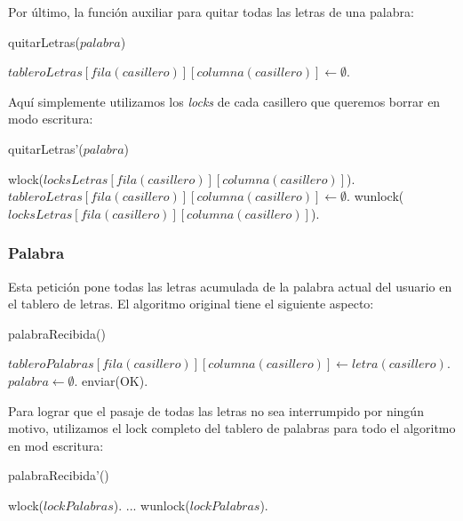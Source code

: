 Por último, la función auxiliar para quitar todas las letras de una palabra:

\begin{algorithm}[H]
\caption{quitarLetras($palabra$)}
\begin{algorithmic}[1]
        \STATE $tableroLetras[fila(casillero)][columna(casillero)] \leftarrow \emptyset$.
    \ENDFOR
\end{algorithmic}
\end{algorithm}

\noindent Aquí simplemente utilizamos los \emph{locks} de cada casillero que queremos borrar en modo escritura:

\begin{algorithm}[H]
\caption{quitarLetras'($palabra$)}
\begin{algorithmic}[1]
        \STATE wlock($locksLetras[fila(casillero)][columna(casillero)]$).
        \STATE $tableroLetras[fila(casillero)][columna(casillero)] \leftarrow \emptyset$.
        \STATE wunlock($locksLetras[fila(casillero)][columna(casillero)]$).
    \ENDFOR
\end{algorithmic}
\end{algorithm}

\subsubsection{Palabra}

Esta petición pone todas las letras acumulada de la palabra actual del usuario en el tablero de letras. El algoritmo original tiene el siguiente aspecto:

\begin{algorithm}[H]
\caption{palabraRecibida()}
\begin{algorithmic}[1]
        \STATE $tableroPalabras[fila(casillero)][columna(casillero)] \leftarrow letra(casillero)$.
    \ENDFOR
    \STATE $palabra \leftarrow \emptyset$.
    \STATE enviar(OK).
\end{algorithmic}
\end{algorithm}

\noindent Para lograr que el pasaje de todas las letras no sea interrumpido por ningún motivo, utilizamos el lock completo del tablero de palabras para todo el algoritmo en mod escritura:

\begin{algorithm}[H]
\caption{palabraRecibida'()}
\begin{algorithmic}[1]
    \STATE wlock($lockPalabras$).
    \STATE ...
    \STATE wunlock($lockPalabras$).
\end{algorithmic}
\end{algorithm}

